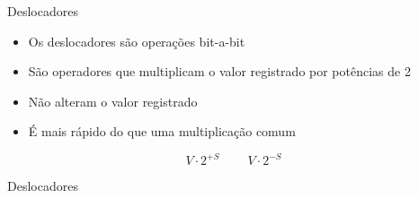 \documentclass[11pt]{beamer}
\begin{document}
	\begin{frame}{Deslocadores}
		\begin{itemize}
			\presentationPause\item Os deslocadores são operações bit-a-bit
			\presentationPause\item São operadores que multiplicam o valor registrado por potências de 2
			\presentationPause\item Não alteram o valor registrado
			\presentationPause\item É mais rápido do que uma multiplicação comum
		\end{itemize}
		\presentationPause
		\begin{equation}\nonumber
		V\!\cdot\!2^{+S} \ \ \ \ \ \ \ \ \ \ V\!\cdot\!2^{-S}
		\end{equation}
	\end{frame}\begin{frame}{Deslocadores}
			
	\end{frame}
\end{document}

